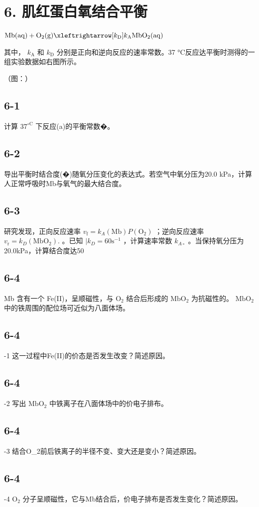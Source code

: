 \section*{6. 肌红蛋白氧结合平衡}
$
\mathrm{Mb} (\mathrm{aq}) + \mathrm{O} _ {2} (\mathrm{g}) \xleftrightarrow [ k _ {\mathrm{D}} ] {k _ {\mathrm{A}}} \mathrm{MbO} _ {2} (\mathrm{aq})
$

其中， $k _ { \mathrm { { A } } }$ 和 $k _ { \mathrm { D } }$ 分别是正向和逆向反应的速率常数。37 °C反应达平衡时测得的⼀组实验数据如右图所⽰。

（图：）

\subsection*{6-1}
计算 $3 7 ^ { \mathrm { { \circ C } } }$ 下反应(a)的平衡常数�。

\subsection*{6-2}
导出平衡时结合度(�)随氧分压变化的表达式。若空⽓中氧分压为20.0 kPa，计算⼈正常呼吸时Mb与氧⽓的最⼤结合度。

\subsection*{6-3}
研究发现，正向反应速率 $v _ { \mathrm { f } } = k _ { A } ( \mathrm { M b } ) P ( \mathrm { O _ { 2 } } )$ ；逆向反应速率 $v _ { \mathrm { r } } = k _ { D } ( \mathrm { M b O _ { 2 } } ) .$ 。已知 $| k _ { D } = 6 0 \mathrm { s } ^ { - 1 }$ ，计算速率常数 $k _ { A \circ }$ 。当保持氧分压为20.0kPa，计算结合度达50%

\subsection*{6-4}
Mb 含有⼀个 Fe(II)，呈顺磁性，与 $\mathrm { O _ { 2 } }$ 结合后形成的 $\mathrm { M b O _ { 2 } }$ 为抗磁性的。 $\mathrm { M b O _ { 2 } }$ 中的铁周围的配位场可近似为⼋⾯体场。

\subsection*{6-4}
-1 这⼀过程中Fe(II)的价态是否发⽣改变？简述原因。

\subsection*{6-4}
-2 写出 $\mathrm { M b O _ { 2 } }$ 中铁离⼦在⼋⾯体场中的价电⼦排布。

\subsection*{6-4}
-3 结合O_{2}前后铁离⼦的半径不变、变⼤还是变⼩？简述原因。

\subsection*{6-4}
-4 $\mathrm { O _ { 2 } }$ 分⼦呈顺磁性，它与Mb结合后，价电⼦排布是否发⽣变化？简述原因。
